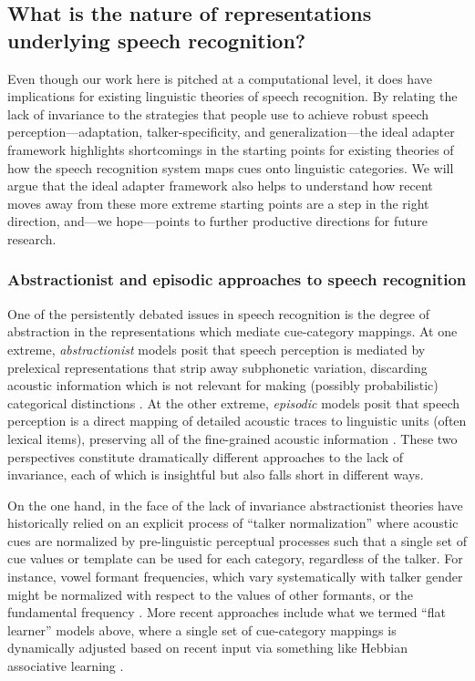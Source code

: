 \label{r2-part3-sec-end}

\subsection{What is the nature of representations underlying speech recognition?}
\label{sec:ling-theor-speech}
\label{r3-epi-abs}
\label{r1-epi-abs}

Even though our work here is pitched at a computational level, it does have implications for existing linguistic theories of speech recognition.  By relating the lack of invariance to the strategies that people use to achieve robust speech perception---adaptation, talker-specificity, and generalization---the ideal adapter framework highlights shortcomings in the starting points for existing theories of how the speech recognition system maps cues onto linguistic categories.  We will argue that the ideal adapter framework also helps to understand how recent moves away from these more extreme starting points are a step in the right direction, and---we hope---points to further productive directions for future research.


\subsubsection{Abstractionist and episodic approaches to speech recognition}
\label{sec:abstr-epis-theor}

One of the persistently debated issues in speech recognition is the degree of abstraction in the representations which mediate cue-category mappings.  At one extreme, \emph{abstractionist} models posit that speech perception is mediated by prelexical representations that strip away subphonetic variation, discarding acoustic information which is not relevant for making (possibly probabilistic) categorical distinctions \autocite{McClelland1986,Norris1994,Norris2000,Norris2008}.  At the other extreme, \emph{episodic} models posit that speech perception is a direct mapping of detailed acoustic traces to linguistic units (often lexical items), preserving all of the fine-grained acoustic information \autocite{Goldinger1998,Johnson1997a,Johnson2006,Pierrehumbert2002}.  These two perspectives constitute dramatically different approaches to the lack of invariance, each of which is insightful but also falls short in different ways.

On the one hand, in the face of the lack of invariance abstractionist theories have historically relied on an explicit process of ``talker normalization'' where acoustic cues are normalized by pre-linguistic perceptual processes such that a single set of cue values or template can be used for each category, regardless of the talker.  For instance, vowel formant frequencies, which vary systematically with talker gender \autocite{Hillenbrand1995,Peterson1952} might be normalized with respect to the values of other formants, or the fundamental frequency \autocite{Strange1989}.  More recent approaches include what we termed ``flat learner'' models above, where a single set of cue-category mappings is dynamically adjusted based on recent input via something like Hebbian associative learning \autocite{Lancia2013,Mirman2006}.

